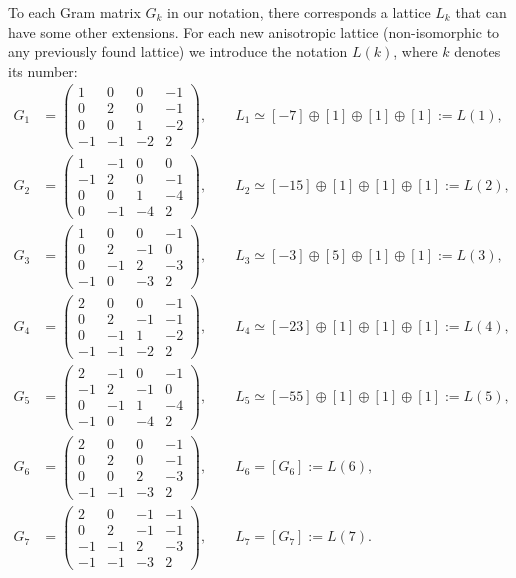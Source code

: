 \documentclass[reqno,12pt]{amsart}
\begin{document}
To each Gram matrix $G_k$ in our notation, there corresponds a lattice $L_k$ that can have some
other extensions. For each new anisotropic lattice 
(non-isomorphic to any previously found lattice) we introduce the notation 
$L(k)$, where $k$ denotes its number:
{\allowdisplaybreaks %
\begin{align*}
G_{1} &=
\begin{pmatrix}
1 & 0 & 0 & -1\\
0 & 2 & 0 & -1\\
0 & 0 & 1 & -2\\
-1 & -1 & -2 & 2
\end{pmatrix}, \qquad L_1 \simeq [-7] \oplus [1] \oplus [1] \oplus [1] := L(1),
\\
G_{2} &=
\begin{pmatrix}
1 & -1 & 0 & 0\\
-1 & 2 & 0 & -1\\
0 & 0 & 1 & -4\\
0 & -1 & -4 & 2
\end{pmatrix}, \qquad L_2 \simeq [-15] \oplus [1] \oplus [1] \oplus [1] := L(2),
\\
G_{3} &=
\begin{pmatrix}
1 & 0 & 0 & -1\\
0 & 2 & -1 & 0\\
0 & -1 & 2 & -3\\
-1 & 0 & -3 & 2
\end{pmatrix}, \qquad L_3 \simeq [-3] \oplus [5] \oplus [1] \oplus [1] := L(3),
\\
G_{4} &=
\begin{pmatrix}
2 & 0 & 0 & -1\\
0 & 2 & -1 & -1\\
0 & -1 & 1 & -2\\
-1 & -1 & -2 & 2
\end{pmatrix}, \qquad L_4 \simeq [-23] \oplus [1] \oplus [1] \oplus [1] := L(4),
\\
G_{5} &=
\begin{pmatrix}
2 & -1 & 0 & -1\\
-1 & 2 & -1 & 0\\
0 & -1 & 1 & -4\\
-1 & 0 & -4 & 2
\end{pmatrix}, \qquad L_5 \simeq [-55] \oplus [1] \oplus [1] \oplus [1] := L(5),
\\
G_{6} &=
\begin{pmatrix}
2 & 0 & 0 & -1\\
0 & 2 & 0 & -1\\
0 & 0 & 2 & -3\\
-1 & -1 & -3 & 2
\end{pmatrix}, \qquad L_6=[G_{6}] := L(6),
\\
G_{7} &=
\begin{pmatrix}
2 & 0 & -1 & -1\\
0 & 2 & -1 & -1\\
-1 & -1 & 2 &-3\\
-1 & -1 & -3 & 2
\end{pmatrix} , \qquad L_7=[G_{7}] := L(7).
\end{align*}
} %
\end{document}
